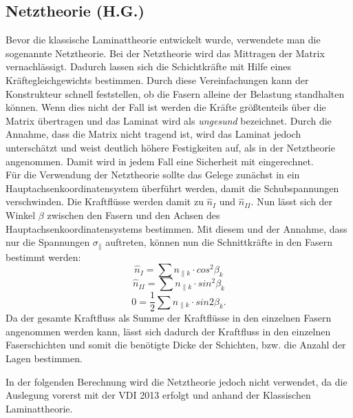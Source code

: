 \subsection{Netztheorie (H.G.)}
Bevor die klassische Laminattheorie entwickelt wurde, verwendete man die sogenannte Netztheorie. 
Bei der Netztheorie wird das Mittragen der Matrix vernachlässigt. Dadurch lassen sich die Schichtkräfte mit Hilfe eines Kräftegleichgewichts bestimmen. 
Durch diese Vereinfachungen kann der Konstrukteur schnell feststellen, ob die Fasern alleine der Belastung standhalten können. Wenn dies nicht der Fall ist werden die Kräfte größtenteils über die Matrix übertragen und das Laminat wird als \textit{ungesund} bezeichnet. Durch die Annahme, dass die Matrix nicht tragend ist, wird das Laminat jedoch unterschätzt und weist deutlich höhere Festigkeiten auf, als in der Netztheorie angenommen. Damit wird in jedem Fall eine Sicherheit mit eingerechnet.\\
Für die Verwendung der Netztheorie sollte das Gelege zunächst in ein Hauptachsenkoordinatensystem überführt werden, damit die Schubspannungen verschwinden. Die Kraftflüsse werden damit zu $\hat{n}_{I}$ und $\hat{n}_{II}$. Nun lässt sich der Winkel $\beta $ zwischen den Fasern und den Achsen des Hauptachsenkoordinatensystems bestimmen. Mit diesem und der Annahme, dass nur die Spannungen $\sigma_{\|}$ auftreten, können nun die Schnittkräfte in den Fasern bestimmt werden:
\begin{equation}
\hat{n}_{I}=\sum n_{\|k}\cdot cos^2\beta_{k}
\end{equation}
\begin{equation}
\hat{n}_{II}=\sum n_{\|k}\cdot sin^2\beta_{k}
\end{equation}
\begin{equation}
0=\frac{1}{2}\sum n_{\|k}\cdot sin2\beta_{k}.
\end{equation}
Da der gesamte Kraftfluss als Summe der Kraftflüsse in den einzelnen Fasern angenommen werden kann, lässt sich dadurch der Kraftfluss in den einzelnen Faserschichten und somit die benötigte Dicke der Schichten, bzw. die Anzahl der Lagen bestimmen\cite{item3}.

\noindent In der folgenden Berechnung wird die Netztheorie jedoch nicht verwendet, da die Auslegung vorerst mit der VDI 2013 erfolgt und anhand der Klassischen Laminattheorie.

